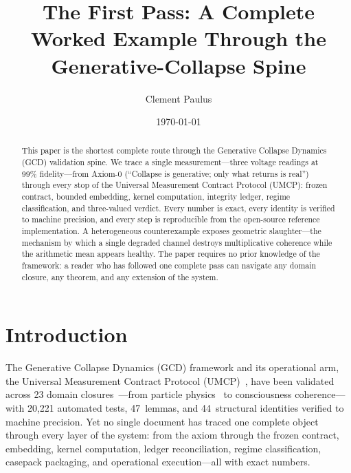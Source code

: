 \documentclass[
  aps,
  prd,
  twocolumn,
  superscriptaddress,
  nofootinbib,
  floatfix
]{revtex4-2}
\begin{document}
\title{The First Pass: A Complete Worked Example Through the
Generative-Collapse Spine}

\author{Clement Paulus}

\date{\today}

\begin{abstract}
This paper is the shortest complete route through the
Generative Collapse Dynamics (GCD) validation spine.  We trace a
single measurement---three voltage readings at 99\% fidelity---from
Axiom-0 (``Collapse is generative; only what returns is real'')
through every stop of the Universal Measurement Contract Protocol
(UMCP): frozen contract, bounded embedding, kernel computation,
integrity ledger, regime classification, and three-valued verdict.
Every number is exact, every identity is verified to machine
precision, and every step is reproducible from the open-source
reference implementation.  A heterogeneous counterexample exposes
geometric slaughter---the mechanism by which a single degraded
channel destroys multiplicative coherence while the arithmetic mean
appears healthy.  The paper requires no prior knowledge of the
framework: a reader who has followed one complete pass can navigate
any domain closure, any theorem, and any extension of the system.
\end{abstract}

\maketitle

\section{Introduction}\label{sec:intro}

The Generative Collapse Dynamics (GCD) framework and its operational
arm, the Universal Measurement Contract Protocol
(UMCP)~\cite{paulus2025umcp,paulus2025physicscoherence}, have been
validated across 23 domain
closures~\cite{umcpmetadatarepo}---from particle
physics~\cite{paulus2025physicscoherence} to consciousness
coherence---with 20{,}221 automated tests, 47~lemmas, and
44~structural identities verified to machine precision.  Yet no
single document has traced one complete object through every layer
of the system: from the axiom through the frozen contract, embedding,
kernel computation, ledger reconciliation, regime classification,
casepack packaging, and operational execution---all with exact numbers.
\end{document}
